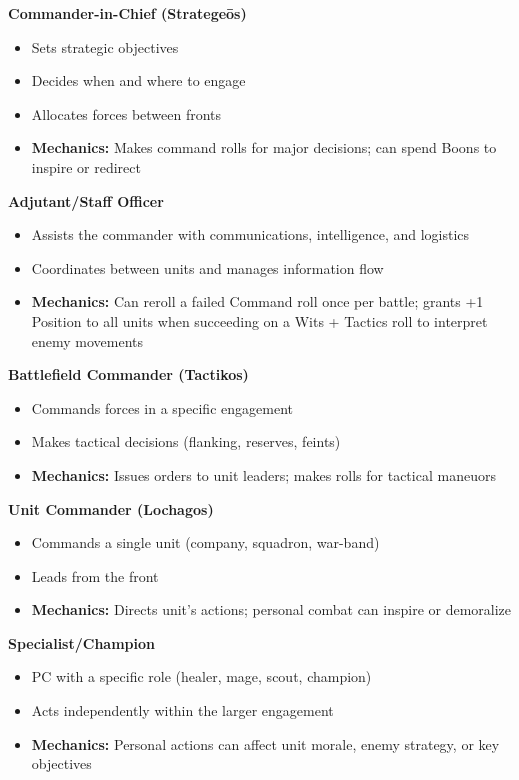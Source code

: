 \documentclass[11pt]{article}
\begin{document}
\textbf{Commander-in-Chief (Strategeōs)}\\
\begin{itemize}
  \item Sets strategic objectives
  \item Decides when and where to engage
  \item Allocates forces between fronts
  \item \textbf{Mechanics:} Makes command rolls for major decisions; can spend Boons to inspire or redirect
\end{itemize}

\textbf{Adjutant/Staff Officer}\\
\begin{itemize}
  \item Assists the commander with communications, intelligence, and logistics
  \item Coordinates between units and manages information flow
  \item \textbf{Mechanics:} Can reroll a failed Command roll once per battle; grants +1 Position to all units when succeeding on a Wits + Tactics roll to interpret enemy movements
\end{itemize}

\textbf{Battlefield Commander (Tactikos)}\\
\begin{itemize}
  \item Commands forces in a specific engagement
  \item Makes tactical decisions (flanking, reserves, feints)
  \item \textbf{Mechanics:} Issues orders to unit leaders; makes rolls for tactical maneuors
\end{itemize}

\textbf{Unit Commander (Lochagos)}\\
\begin{itemize}
  \item Commands a single unit (company, squadron, war-band)
  \item Leads from the front
  \item \textbf{Mechanics:} Directs unit's actions; personal combat can inspire or demoralize
\end{itemize}

\textbf{Specialist/Champion}\\
\begin{itemize}
  \item PC with a specific role (healer, mage, scout, champion)
  \item Acts independently within the larger engagement
  \item \textbf{Mechanics:} Personal actions can affect unit morale, enemy strategy, or key objectives
\end{itemize}
\end{document}
